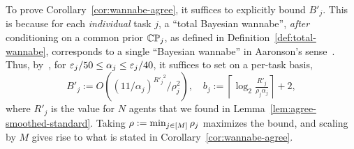 To prove Corollary~\ref{cor:wannabe-agree}, it suffices to explicitly bound $B'_j$.
This is because for each \emph{individual} task $j$, a ``total Bayesian wannabe'', \emph{after} conditioning on a common prior $\mathbb{C}\mathbb{P}_j$, as defined in Definition~\ref{def:total-wannabe}, corresponds to a single ``Bayesian wannabe'' in Aaronson's sense~\citep[pg. 19]{aaronson2005complexity}.
Thus, by~\citep[Theorem 20]{aaronson2005complexity}, for $\varepsilon_j/50 \le \alpha_j \le \varepsilon_j/40$, it suffices to set on a per-task basis,
\begin{equation}\label{eq:total-bayesian}
B'_j := O\left((11/\alpha_j)^{{R'_j}^2}/\rho_j^2\right), \quad 
b_j := \left\lceil \log_2 \tfrac{R'_j}{\rho_j \alpha_j} \right\rceil + 2,
\end{equation}
where $R'_j$ is the value for $N$ agents that we found in Lemma~\ref{lem:agree-smoothed-standard}.
Taking $\rho := \min_{j \in [M]} \rho_j$ maximizes the bound, and scaling by $M$ gives rise to what is stated in Corollary~\ref{cor:wannabe-agree}.